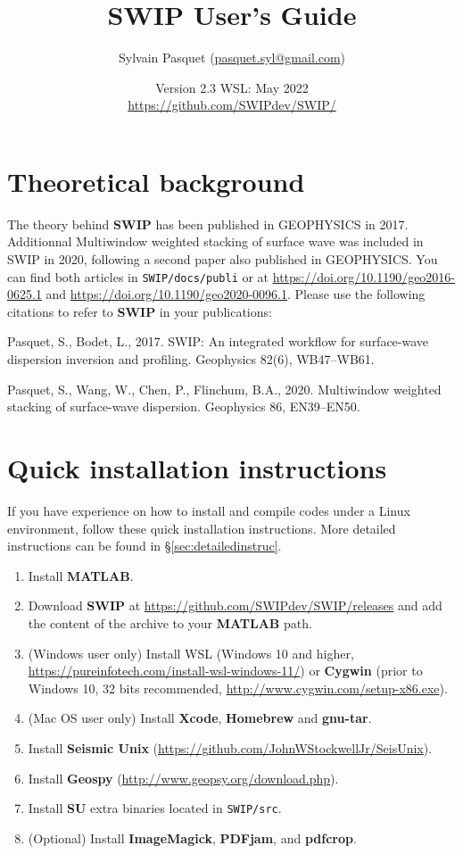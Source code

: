 \documentclass[twoside,a4paper]{article}
\title{\vspace{5cm}\Huge{\textbf{SWIP User's Guide}}}
\author{\Large{Sylvain Pasquet} (\url{pasquet.syl@gmail.com})}
\date{\LARGE{Version 2.3 WSL: May 2022}\\[2ex]
\large\url{https://github.com/SWIPdev/SWIP/}}
\def\SWIP{\textbf{SWIP}}
\def\SU{\textbf{SU}}
\def\SeismicUnix{\textbf{Seismic Unix}}
\def\Geopsy{\textbf{Geospy}}
\def\ImageMagick{\textbf{ImageMagick}}
\def\PDFjam{\textbf{PDFjam}}
\def\pdfcrop{\textbf{pdfcrop}}
\def\MATLAB{\textbf{MATLAB}}
\def\Cygwin{\textbf{Cygwin}}
\begin{document}
\maketitle
\thispagestyle{empty}
\newpage
\tableofcontents

\newpage
\section{Theoretical background}
The theory behind {\SWIP} has been published in GEOPHYSICS in 2017. Additionnal Multiwindow weighted stacking of surface wave was included in SWIP in 2020, following a second paper also published in GEOPHYSICS. You can find both articles in \verb|SWIP/docs/publi| or at \url{https://doi.org/10.1190/geo2016-0625.1} and \url{https://doi.org/10.1190/geo2020-0096.1}. Please use the following citations to refer to {\SWIP} in your publications:

Pasquet, S., Bodet, L., 2017. SWIP: An integrated workflow for surface-wave dispersion inversion and profiling. Geophysics 82(6), WB47–WB61.

Pasquet, S., Wang, W., Chen, P., Flinchum, B.A., 2020. Multiwindow weighted stacking of surface-wave dispersion. Geophysics 86, EN39–EN50.

\section{Quick installation instructions}
If you have experience on how to install and compile codes under a Linux environment, follow these quick installation instructions. More detailed instructions can be found in §\ref{sec:detailedinstruc}.
\begin{enumerate}[leftmargin=*]
\setlength\itemsep{2ex}
\item Install {\MATLAB}.
\item Download {\SWIP} at \url{https://github.com/SWIPdev/SWIP/releases} and add the content of the archive to your {\MATLAB} path.
\item (Windows user only) Install WSL (Windows 10 and higher, \url{https://pureinfotech.com/install-wsl-windows-11/}) or {\Cygwin} (prior to Windows 10, 32 bits recommended, \url{http://www.cygwin.com/setup-x86.exe}).
\item (Mac OS user only) Install \textbf{Xcode}, \textbf{Homebrew} and \textbf{gnu-tar}.
\item Install {\SeismicUnix} (\url{https://github.com/JohnWStockwellJr/SeisUnix}).
\item Install {\Geopsy} (\url{http://www.geopsy.org/download.php}).
\item Install {\SU} extra binaries located in \verb|SWIP/src|.
\item (Optional) Install {\ImageMagick}, {\PDFjam}, and {\pdfcrop}.
\end{enumerate}
\end{document}
